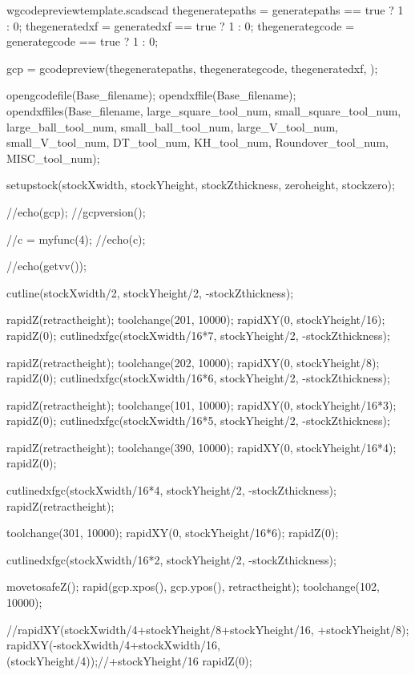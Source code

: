 \documentclass{ltxdoc}
\begin{document}
\begin{writecode}{w}{gcodepreviewtemplate.scad}{scad}
thegeneratepaths = generatepaths == true ? 1 : 0;
thegeneratedxf = generatedxf == true ? 1 : 0;
thegenerategcode = generategcode == true ? 1 : 0;

gcp = gcodepreview(thegeneratepaths, 
                   thegenerategcode, 
                   thegeneratedxf, 
                   );

opengcodefile(Base_filename);
opendxffile(Base_filename);
opendxffiles(Base_filename, 
                 large_square_tool_num, 
                 small_square_tool_num, 
                 large_ball_tool_num, 
                 small_ball_tool_num, 
                 large_V_tool_num, 
                 small_V_tool_num, 
                 DT_tool_num, 
                 KH_tool_num, 
                 Roundover_tool_num, 
                 MISC_tool_num);

setupstock(stockXwidth, stockYheight, stockZthickness, zeroheight, stockzero);

//echo(gcp);
//gcpversion();

//c = myfunc(4);
//echo(c);

//echo(getvv());

cutline(stockXwidth/2, stockYheight/2, -stockZthickness);

rapidZ(retractheight);
toolchange(201, 10000);
rapidXY(0, stockYheight/16);
rapidZ(0);
cutlinedxfgc(stockXwidth/16*7, stockYheight/2, -stockZthickness);


rapidZ(retractheight);
toolchange(202, 10000);
rapidXY(0, stockYheight/8);
rapidZ(0);
cutlinedxfgc(stockXwidth/16*6, stockYheight/2, -stockZthickness);

rapidZ(retractheight);
toolchange(101, 10000);
rapidXY(0, stockYheight/16*3);
rapidZ(0);
cutlinedxfgc(stockXwidth/16*5, stockYheight/2, -stockZthickness);

rapidZ(retractheight);
toolchange(390, 10000);
rapidXY(0, stockYheight/16*4);
rapidZ(0);

cutlinedxfgc(stockXwidth/16*4, stockYheight/2, -stockZthickness);
rapidZ(retractheight);

toolchange(301, 10000);
rapidXY(0, stockYheight/16*6);
rapidZ(0);

cutlinedxfgc(stockXwidth/16*2, stockYheight/2, -stockZthickness);


movetosafeZ();
rapid(gcp.xpos(), gcp.ypos(), retractheight);
toolchange(102, 10000);

//rapidXY(stockXwidth/4+stockYheight/8+stockYheight/16, +stockYheight/8);
rapidXY(-stockXwidth/4+stockXwidth/16, (stockYheight/4));//+stockYheight/16
rapidZ(0);


\end{writecode}
\end{document}

